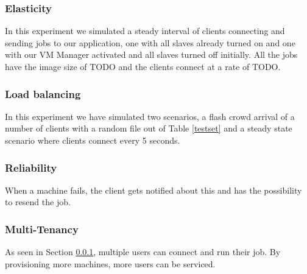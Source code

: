 
\subsubsection{Elasticity}
\label{elastic}
In this experiment we simulated a steady interval of clients connecting and sending jobs to our application, one with all slaves already turned on and one with our VM Manager activated and all slaves turned off initially. All the jobs have the image size of TODO and the clients connect at a rate of TODO.


\subsubsection{Load balancing}
In this experiment we have simulated two scenarios, a flash crowd arrival of a number of clients with a random file out of Table \ref{testset} and a steady state scenario where clients connect every 5 seconds. %

\subsubsection{Reliability}
When a machine fails, the client gets notified about this and has the possibility to resend the job. 

\subsubsection{Multi-Tenancy}
As seen in Section \ref{elastic}, multiple users can connect and run their job. By provisioning more machines, more users can be serviced.
